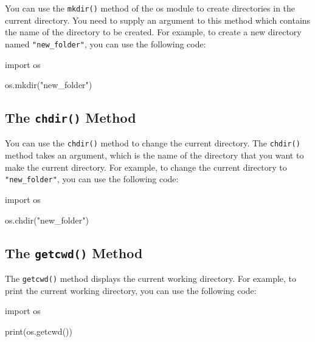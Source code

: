 \documentclass[11pt]{article}
\newenvironment{Shaded}{}{}
\newcommand{\StringTok}[1]{\textcolor[rgb]{0.25,0.44,0.63}{{#1}}}
\newcommand{\NormalTok}[1]{{#1}}
\newcommand{\ImportTok}[1]{{#1}}
\newcommand{\BuiltInTok}[1]{{#1}}
\begin{document}
You can use the \texttt{mkdir()} method of the os module to create
directories in the current directory. You need to supply an argument to
this method which contains the name of the directory to be created. For
example, to create a new directory named \texttt{"new\_folder"}, you can
use the following code:

\begin{Shaded}
\begin{Highlighting}[]
\ImportTok{import}\NormalTok{ os}

\NormalTok{os.mkdir(}\StringTok{"new\_folder"}\NormalTok{)}
\end{Highlighting}
\end{Shaded}

\hypertarget{the-chdir-method}{%
\subsection{\texorpdfstring{The \texttt{chdir()}
Method}{The chdir() Method}}\label{the-chdir-method}}

You can use the \texttt{chdir()} method to change the current directory.
The \texttt{chdir()} method takes an argument, which is the name of the
directory that you want to make the current directory. For example, to
change the current directory to \texttt{"new\_folder"}, you can use the
following code:

\begin{Shaded}
\begin{Highlighting}[]
\ImportTok{import}\NormalTok{ os}

\NormalTok{os.chdir(}\StringTok{"new\_folder"}\NormalTok{)}
\end{Highlighting}
\end{Shaded}

\hypertarget{the-getcwd-method}{%
\subsection{\texorpdfstring{The \texttt{getcwd()}
Method}{The getcwd() Method}}\label{the-getcwd-method}}

The \texttt{getcwd()} method displays the current working directory. For
example, to print the current working directory, you can use the
following code:

\begin{Shaded}
\begin{Highlighting}[]
\ImportTok{import}\NormalTok{ os}

\BuiltInTok{print}\NormalTok{(os.getcwd())}
\end{Highlighting}
\end{Shaded}
\end{document}
